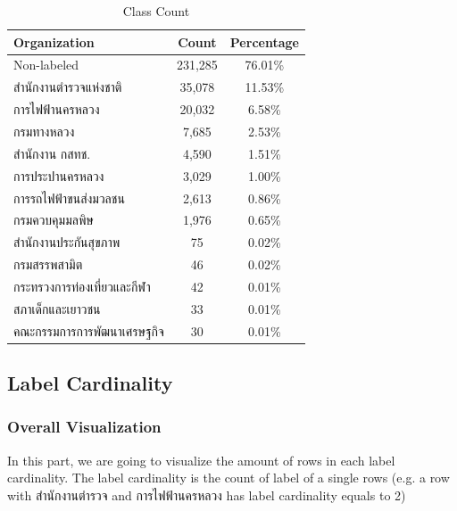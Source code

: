 \documentclass[12pt, a4paper]{article}
\begin{document}
                    \begin{table}[h]
                        \centering
                        \begin{tabular}{|l|c|c|}
                            \hline
                            \rule{0pt}{2.5ex}
                            \textbf{Organization} & \textbf{Count} & \textbf{Percentage} \\
                            \hline \hline
                            Non-labeled & 231,285 & 76.01\% \\
                            สำนักงานตำรวจแห่งชาติ & 35,078 & 11.53\% \\
                            การไฟฟ้านครหลวง & 20,032 & 6.58\% \\
                            กรมทางหลวง & 7,685 & 2.53\% \\
                            สำนักงาน กสทช. & 4,590 & 1.51\% \\
                            การประปานครหลวง & 3,029 & 1.00\% \\
                            การรถไฟฟ้าขนส่งมวลชน & 2,613 & 0.86\% \\
                            กรมควบคุมมลพิษ & 1,976 & 0.65\% \\
                            สำนักงานประกันสุขภาพ & 75 & 0.02\% \\
                            กรมสรรพสามิต & 46 & 0.02\% \\
                            กระทรวงการท่องเที่ยวและกีฬา & 42 & 0.01\% \\
                            สภาเด็กและเยาวชน & 33 & 0.01\% \\
                            คณะกรรมการการพัฒนาเศรษฐกิจ & 30 & 0.01\% \\
                            \hline
                        \end{tabular}
                        \caption{Class Count}
                    \end{table}

    \pagebreak

            \subsection{Label Cardinality}
                \subsubsection{Overall Visualization}
                    In this part, we are going to visualize the amount of rows in each label cardinality.
                    The label cardinality is the count of label of a single rows
                    (e.g. a row with สำนักงานตำรวจ and การไฟฟ้านครหลวง has label cardinality equals to 2)
\end{document}
